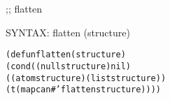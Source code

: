 \begin{aibox}{\function}
;; flatten

SYNTAX: flatten (structure)
\end{aibox}

\begin{aibox}{\examples}
\begin{alltt}
\end{alltt}

\end{aibox}

\begin{aibox}{\comments}

\end{aibox}
\begin{aibox}{\answers}

\end{aibox}
\begin{aibox}{\othercomments}

\end{aibox}
\begin{aibox}{\pseudocode}

\end{aibox}
\begin{aibox}{\code}

\begin{alltt}

(defun flatten (structure)
    (cond ((null structure) nil)
        ((atom structure) (list structure))
      (t (mapcan #'flatten structure))))

\end{alltt}
\end{aibox}
